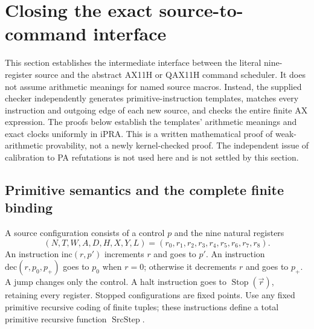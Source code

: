 \section{Closing the exact source-to-command interface}
\label{sec:source-command-complete}

This section establishes the intermediate interface between the literal
nine-register source and the abstract AX11H or QAX11H command scheduler.
It does not assume arithmetic meanings for named source macros.  Instead,
the supplied checker independently generates primitive-instruction templates,
matches every instruction and outgoing edge of each new source, and checks
the entire finite AX expression.  The proofs below establish the templates'
arithmetic meanings and exact clocks uniformly in $\mathrm{iPRA}$.
This is a written mathematical proof of weak-arithmetic provability, not
a newly kernel-checked proof.  The independent issue of calibration to PA
refutations is not used here and is not settled by this section.

\subsection{Primitive semantics and the complete finite binding}

A source configuration consists of a control $p$ and the nine natural
registers
\[
 (N,T,W,A,D,H,X,Y,L)=(r_0,r_1,r_2,r_3,r_4,r_5,r_6,r_7,r_8).
\]
An instruction $\mathrm{inc}(r,p')$ increments $r$ and goes to $p'$.
An instruction $\mathrm{dec}(r,p_0,p_+)$ goes to $p_0$ when $r=0$;
otherwise it decrements $r$ and goes to $p_+$.  A jump changes only the
control.  A halt instruction goes to $\operatorname{Stop}(\vec r)$,
retaining every register.  Stopped configurations are fixed points.
Use any fixed primitive recursive coding of finite tuples; these
instructions define a total primitive recursive function
$\operatorname{SrcStep}$.

